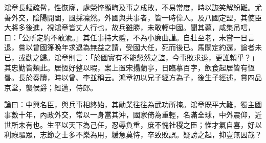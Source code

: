 \begin{pinyinscope}
鴻章長軀疏髯，性恢廓，處榮悴顯晦及事之成敗，不易常度，時以詼笑解紛難。尤善外交，陰陽開闔，風採凜然。外國與共事者，皆一時偉人。及八國定盟，其使臣大將多後進，視鴻章皆丈人行也，故兵雖勝，未敢輕中國。聞其薨，咸集吊唁，曰：「公所定約不敢渝。」其任事持大體，不為小廉曲謹。自壯至老，未嘗一日言退，嘗以曾國籓晚年求退為無益之請，受國大任，死而後已。馬關定約還，論者未已，或勸之歸。鴻章則言：「於國實有不能恝然之誼，今事敗求退，更誰賴乎？」其忠勤皆類此。居恆好整以暇，案上置宋搨蘭亭，日臨摹百字，飲食起居皆有恆晷。長於奏牘，時以曾、李並稱云。鴻章初以兄子經方為子，後生子經述，賞四品京堂，襲侯爵；經邁，侍郎。

論曰：中興名臣，與兵事相終始，其勛業往往為武功所掩。鴻章既平大難，獨主國事數十年，內政外交，常以一身當其沖，國家倚為重輕，名滿全球，中外震仰，近世所未有也。生平以天下為己任，忍辱負重，庶不愧社稷之臣；惟才氣自喜，好以利祿驅眾，志節之士多不樂為用，緩急莫恃，卒致敗誤。疑謗之起，抑豈無因哉？


\end{pinyinscope}